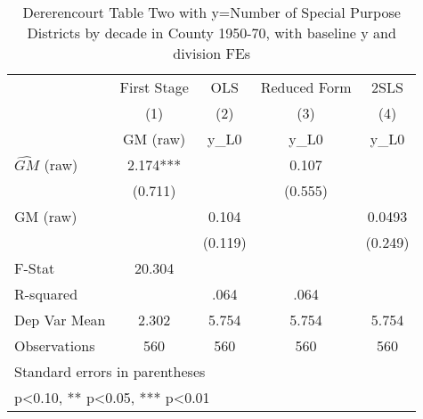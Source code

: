 \begin{table}[htbp]\centering
\def\sym#1{\ifmmode^{#1}\else\(^{#1}\)\fi}
\caption{Dererencourt Table Two with y=Number of Special Purpose Districts by decade in County 1950-70, with baseline y and division FEs}
\begin{tabular}{l*{4}{c}}
\toprule
                    & First Stage   &         OLS   &Reduced Form   &        2SLS   \\
                    &\multicolumn{1}{c}{(1)}&\multicolumn{1}{c}{(2)}&\multicolumn{1}{c}{(3)}&\multicolumn{1}{c}{(4)}\\
                    &\multicolumn{1}{c}{GM  (raw)}&\multicolumn{1}{c}{y\_L0}&\multicolumn{1}{c}{y\_L0}&\multicolumn{1}{c}{y\_L0}\\
\midrule
$\hat{GM}$ (raw)    &       2.174***&               &       0.107   &               \\
                    &     (0.711)   &               &     (0.555)   &               \\
\addlinespace
GM  (raw)           &               &       0.104   &               &      0.0493   \\
                    &               &     (0.119)   &               &     (0.249)   \\
\midrule
F-Stat              &      20.304   &               &               &               \\
R-squared           &               &        .064   &        .064   &               \\
Dep Var Mean        &       2.302   &       5.754   &       5.754   &       5.754   \\
Observations        &         560   &         560   &         560   &         560   \\
\bottomrule
\multicolumn{5}{l}{\footnotesize Standard errors in parentheses}\\
\multicolumn{5}{l}{\footnotesize * p<0.10, ** p<0.05, *** p<0.01}\\
\end{tabular}
\end{table}
